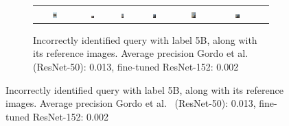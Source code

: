 \begin{figure}
\begin{subfigure}{\textwidth}
\begin{tabular}{|c|*{6}{c}}
\includegraphics[width=0.12\textwidth]{img/5B-0506.JPG} &
\includegraphics[width=0.12\textwidth]{img/5B-0.JPG} &
\includegraphics[width=0.12\textwidth]{img/5B-1.JPG} &
\includegraphics[width=0.12\textwidth]{img/5B-2.JPG} &
\includegraphics[width=0.12\textwidth]{img/5B-3.JPG} &
\includegraphics[width=0.12\textwidth]{img/5B-4.JPG} \\
\end{tabular}
\caption{Incorrectly identified query with label 5B,
along with its reference images.\newline
Average precision Gordo et al.~\cite{gordo_deep_2016} (ResNet-50): 0.013,
fine-tuned ResNet-152: 0.002
\label{fig:incorrect5B}}
\end{subfigure}


\end{figure}
